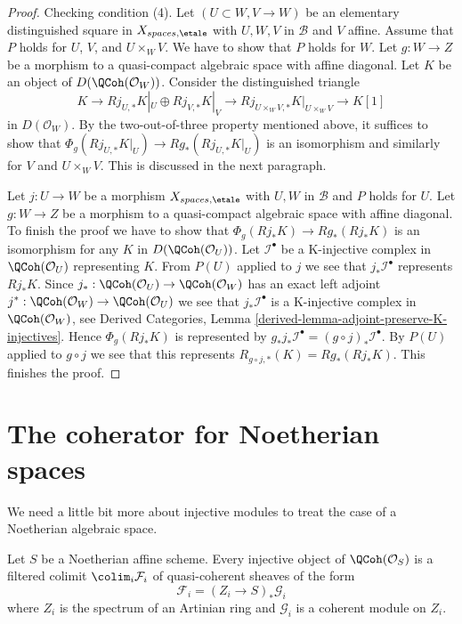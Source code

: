 \begin{proof}
\medskip\noindent
Checking condition (4).
Let $(U \subset W, V \to W)$ be an elementary distinguished square
in $X_{spaces, \etale}$ with $U, W, V$ in $\mathcal{B}$ and $V$ affine.
Assume that $P$ holds for $U$, $V$, and $U \times_W V$.
We have to show that $P$ holds for $W$. Let $g : W \to Z$
be a morphism to a quasi-compact algebraic space with affine diagonal.
Let $K$ be an object of $D(\QCoh(\mathcal{O}_W))$.
Consider the distinguished triangle
$$
K \to Rj_{U, *}K|_U \oplus Rj_{V, *}K|_V \to
Rj_{U \times_W V, *}K|_{U \times_W V} \to K[1]
$$
in $D(\mathcal{O}_W)$. By the two-out-of-three property mentioned
above, it suffices to show that $\Phi_g(Rj_{U, *}K|_U) \to Rg_*(Rj_{U, *}K|_U)$
is an isomorphism and similarly for $V$ and $U \times_W V$.
This is discussed in the next paragraph.

\medskip\noindent
Let $j : U \to W$ be a morphism $X_{spaces, \etale}$ with
$U, W$ in $\mathcal{B}$ and $P$ holds for $U$. Let $g : W \to Z$
be a morphism to a quasi-compact algebraic space with affine diagonal.
To finish the proof we have to show that
$\Phi_g(Rj_*K) \to Rg_*(Rj_*K)$
is an isomorphism for any $K$ in $D(\QCoh(\mathcal{O}_U))$.
Let $\mathcal{I}^\bullet$ be a K-injective complex in $\QCoh(\mathcal{O}_U)$
representing $K$.
From $P(U)$ applied to $j$ we see that
$j_*\mathcal{I}^\bullet$ represents $Rj_*K$.
Since $j_* : \QCoh(\mathcal{O}_U) \to \QCoh(\mathcal{O}_W)$
has an exact left adjoint
$j^* : \QCoh(\mathcal{O}_W) \to \QCoh(\mathcal{O}_U)$
we see that $j_*\mathcal{I}^\bullet$ is a K-injective complex
in $\QCoh(\mathcal{O}_W)$, see
Derived Categories, Lemma \ref{derived-lemma-adjoint-preserve-K-injectives}.
Hence $\Phi_g(Rj_*K)$ is represented by
$g_*j_*\mathcal{I}^\bullet = (g \circ j)_*\mathcal{I}^\bullet$.
By $P(U)$ applied to $g \circ j$ we see that this represents
$R_{g \circ j, *}(K) = Rg_*(Rj_*K)$. This finishes the proof.
\end{proof}









\section{The coherator for Noetherian spaces}
\label{section-coherator-Noetherian}

\noindent
We need a little bit more about injective modules to treat the case
of a Noetherian algebraic space.

\begin{lemma}
\label{lemma-affine-injective-colimit-direct-sum-pushforwards-artin}
Let $S$ be a Noetherian affine scheme. Every injective object of
$\QCoh(\mathcal{O}_S)$ is a filtered colimit $\colim_i \mathcal{F}_i$
of quasi-coherent sheaves of the form
$$
\mathcal{F}_i = (Z_i \to S)_*\mathcal{G}_i
$$
where $Z_i$ is the spectrum of an Artinian ring and $\mathcal{G}_i$
is a coherent module on $Z_i$.
\end{lemma}

